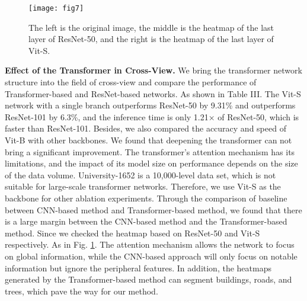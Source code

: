 \documentclass[lettersize,journal]{IEEEtran}
\begin{document}
\begin{figure}[!t]
\centering
\texttt{[image: fig7]}
\caption{The left is the original image, the middle is the heatmap of the last layer of ResNet-50, and the right is the heatmap of the last layer of Vit-S.}
\label{fig_7}
\end{figure}


\textbf{Effect of the Transformer in Cross-View.} We bring the transformer network structure into the field of cross-view and compare the performance of Transformer-based and ResNet-based networks. As shown in Table III. The Vit-S network with a single branch outperforms ResNet-50 by 9.31\% and outperforms ResNet-101 by 6.3\%, and the inference time is only 1.21× of ResNet-50, which is faster than ResNet-101. Besides, we also compared the accuracy and  speed of Vit-B with other backbones. We found that deepening the transformer can not bring a significant improvement. The transformer's attention mechanism has its limitations, and the impact of its model size on performance depends on the size of the data volume. University-1652 is a 10,000-level data set, which is not suitable for large-scale transformer networks. Therefore, we use Vit-S as the backbone for other ablation experiments. Through the comparison of baseline between CNN-based method and Transformer-based method, we found that there is a large margin between the CNN-based method and the Transformer-based method. Since we checked the heatmap based on ResNet-50 and Vit-S respectively. As in Fig. \ref{fig_7}. The attention mechanism allows the network to focus on global information, while the CNN-based approach will only focus on notable information but ignore the peripheral features. In addition, the heatmaps generated by the Transformer-based method can segment buildings, roads, and trees, which pave the way for our method. 
\end{document}
